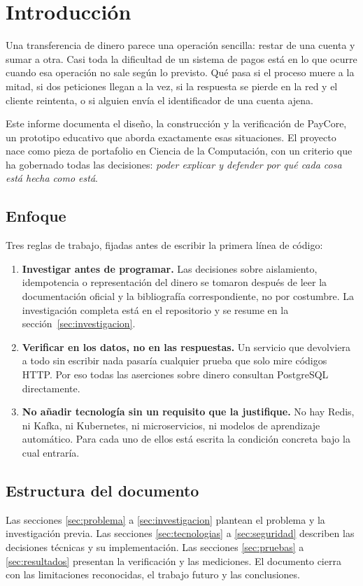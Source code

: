 \section{Introducción}

Una transferencia de dinero parece una operación sencilla: restar de una
cuenta y sumar a otra. Casi toda la dificultad de un sistema de pagos está en
lo que ocurre cuando esa operación no sale según lo previsto. Qué pasa si el
proceso muere a la mitad, si dos peticiones llegan a la vez, si la respuesta
se pierde en la red y el cliente reintenta, o si alguien envía el
identificador de una cuenta ajena.

Este informe documenta el diseño, la construcción y la verificación de
PayCore, un prototipo educativo que aborda exactamente esas situaciones. El
proyecto nace como pieza de portafolio en Ciencia de la Computación, con un
criterio que ha gobernado todas las decisiones: \emph{poder explicar y
defender por qué cada cosa está hecha como está}.

\subsection{Enfoque}

Tres reglas de trabajo, fijadas antes de escribir la primera línea de código:

\begin{enumerate}[leftmargin=1.4em]
  \item \textbf{Investigar antes de programar.} Las decisiones sobre
    aislamiento, idempotencia o representación del dinero se tomaron después
    de leer la documentación oficial y la bibliografía correspondiente, no por
    costumbre. La investigación completa está en el repositorio y se resume en
    la sección~\ref{sec:investigacion}.
  \item \textbf{Verificar en los datos, no en las respuestas.} Un servicio que
    devolviera  a todo sin escribir nada pasaría cualquier
    prueba que solo mire códigos HTTP. Por eso todas las aserciones sobre
    dinero consultan PostgreSQL directamente.
  \item \textbf{No añadir tecnología sin un requisito que la justifique.} No
    hay Redis, ni Kafka, ni Kubernetes, ni microservicios, ni modelos de
    aprendizaje automático. Para cada uno de ellos está escrita la condición
    concreta bajo la cual entraría.
\end{enumerate}

\subsection{Estructura del documento}

Las secciones \ref{sec:problema} a \ref{sec:investigacion} plantean el
problema y la investigación previa. Las secciones \ref{sec:tecnologias} a
\ref{sec:seguridad} describen las decisiones técnicas y su implementación. Las
secciones \ref{sec:pruebas} a \ref{sec:resultados} presentan la verificación y
las mediciones. El documento cierra con las limitaciones reconocidas, el
trabajo futuro y las conclusiones.
